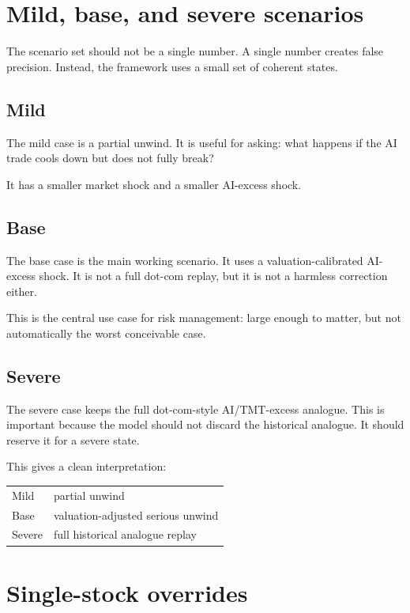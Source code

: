 \documentclass[10pt]{article}
\begin{document}
\section{Mild, base, and severe scenarios}

The scenario set should not be a single number. A single number creates false precision. Instead, the framework uses a small set of coherent states.

\subsection{Mild}

The mild case is a partial unwind. It is useful for asking: what happens if the AI trade cools down but does not fully break?

It has a smaller market shock and a smaller AI-excess shock.

\subsection{Base}

The base case is the main working scenario. It uses a valuation-calibrated AI-excess shock. It is not a full dot-com replay, but it is not a harmless correction either.

This is the central use case for risk management: large enough to matter, but not automatically the worst conceivable case.

\subsection{Severe}

The severe case keeps the full dot-com-style AI/TMT-excess analogue. This is important because the model should not discard the historical analogue. It should reserve it for a severe state.

This gives a clean interpretation:

\begin{center}
\begin{tabular}{ll}
Mild & partial unwind \\
Base & valuation-adjusted serious unwind \\
Severe & full historical analogue replay
\end{tabular}
\end{center}

\section{Single-stock overrides}
\end{document}
